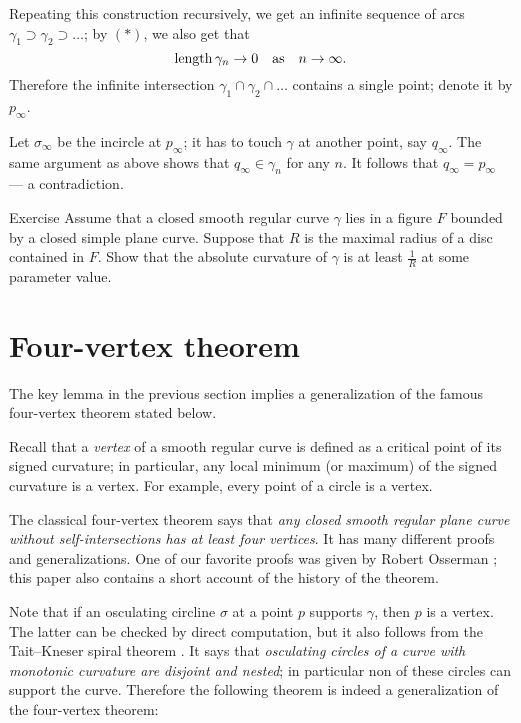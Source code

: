 \documentclass{article}
\begin{document}
Repeating this construction recursively,
we get an infinite sequence of arcs $\gamma_1\supset \gamma_2\supset\dots$;
by $({*})$, we also get that 
\[\mathop{\rm length}\nolimits\gamma_n\to0\quad\text{as}\quad n\to\infty.\] 
Therefore the infinite intersection $\gamma_1\cap\gamma_2\cap\dots$
contains a single point; denote it by $p_\infty$.

Let $\sigma_\infty$ be the incircle at $p_\infty$; it has to touch $\gamma$ at another point, say $q_\infty$.
The same argument as above shows that $q_\infty\in\gamma_n$ for any $n$.
It follows that $q_\infty =p_\infty$ --- a contradiction.
\qeds

\begin{thm}{Exercise}\label{ex:moon-rad}
Assume that a closed smooth regular curve $\gamma$ lies in a figure $F$ bounded by a closed simple plane curve.
Suppose that $R$ is the maximal radius of a disc contained in $F$.
Show that the absolute curvature of $\gamma$ is at least $\tfrac1R$ at some parameter value.
\end{thm}


\section*{Four-vertex theorem}


The key lemma in the previous section implies a generalization of the famous four-vertex theorem stated below.

Recall that a \emph{vertex} of a smooth regular curve is defined as a critical point of its signed curvature;
in particular, any local minimum (or maximum) of the signed curvature is a vertex.
For example, every point of a circle is a vertex.

The classical four-vertex theorem says that \emph{any closed smooth regular plane curve without self-intersections has at least four vertices}.
It has many different proofs and generalizations.
One of our favorite proofs was given by Robert Osserman \cite{osserman}; this paper also contains a short account of the history of the theorem.

Note that if an osculating circline $\sigma$ at a point $p$ supports $\gamma$, then $p$ is a vertex.
The latter can be checked by direct computation, but it also follows from the Tait--Kneser spiral theorem \cite{ghys-tabachnikov-timorin}.
It says that \emph{osculating circles of a curve with monotonic curvature are disjoint and nested};
in particular non of these circles can support the curve.
Therefore the following theorem is indeed a generalization of the four-vertex theorem:
\end{document}
